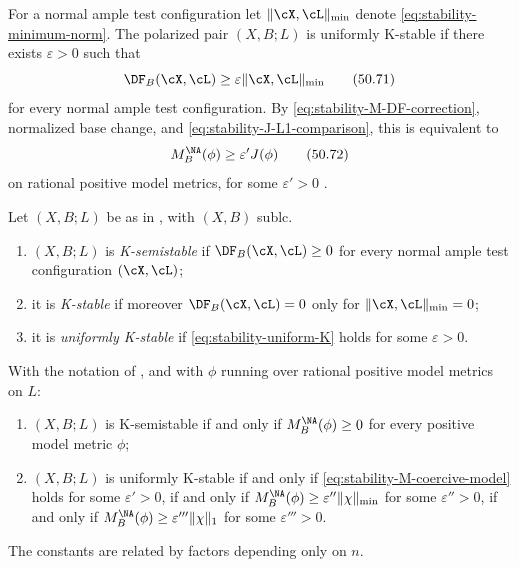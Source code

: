For a normal ample test configuration let
$\|\cX,\cL\|_{\min}$ denote
\eqref{eq:stability-minimum-norm}.  The polarized pair $(X,B;L)$ is
uniformly K-stable if there exists $\varepsilon>0$ such that
\[
       \DF_B(\cX,\cL)
            \geq\varepsilon\|\cX,\cL\|_{\min}
\tag{50.71}\label{eq:stability-uniform-K}
\]
for every normal ample test configuration.  By
\eqref{eq:stability-M-DF-correction}, normalized base change, and
\eqref{eq:stability-J-L1-comparison}, this is equivalent to
\[
                     M_B^{\NA}(\phi)\geq\varepsilon'J(\phi)
\tag{50.72}\label{eq:stability-M-coercive-model}
\]
on rational positive model metrics, for some $\varepsilon'>0$
\cite[Proposition~8.2]{BHJ17}.

\begin{definition}
\label{def:ch50-k-stability}
Let $(X,B;L)$ be as in , with $(X,B)$ sublc.
\begin{enumerate}
\item\label{itm:ch50-ks:semi}
      $(X,B;L)$ is \emph{K-semistable} if $\DF_B(\cX,\cL)\ge0$ for
      every normal ample test configuration $(\cX,\cL)$;
\item\label{itm:ch50-ks:stable}
      it is \emph{K-stable} if moreover $\DF_B(\cX,\cL)=0$ only for
      $\|\cX,\cL\|_{\min}=0$;
\item\label{itm:ch50-ks:uniform}
      it is \emph{uniformly K-stable} if \eqref{eq:stability-uniform-K}
      holds for some $\varepsilon>0$.
\end{enumerate}
\end{definition}

\begin{proposition}
\label{prop:ch50-model-form}
With the notation of , and with
$\phi$ running over rational positive model metrics on $L$:
\begin{enumerate}
\item\label{itm:ch50-mf:semi}
      $(X,B;L)$ is K-semistable if and only if $M^{\NA}_B(\phi)\ge0$
      for every positive model metric $\phi$;
\item\label{itm:ch50-mf:uniform}
      $(X,B;L)$ is uniformly K-stable if and only if
      \eqref{eq:stability-M-coercive-model} holds for some
      $\varepsilon'>0$, if and only if
      $M^{\NA}_B(\phi)\ge\varepsilon''\|\chi\|_{\min}$ for some
      $\varepsilon''>0$, if and only if
      $M^{\NA}_B(\phi)\ge\varepsilon'''\|\chi\|_1$ for some
      $\varepsilon'''>0$.
\end{enumerate}
The constants are related by factors depending only on $n$.
\end{proposition}

